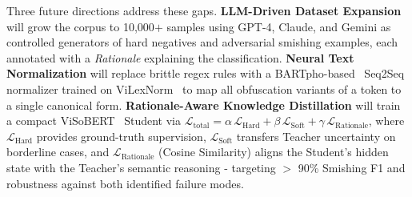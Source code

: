 \documentclass[conference]{IEEEtran}
\begin{document}
Three future directions address these gaps. \textbf{LLM-Driven Dataset
Expansion} will grow the corpus to 10,000$+$ samples using GPT-4, Claude, and
Gemini as controlled generators of hard negatives and adversarial smishing
examples, each annotated with a \textit{Rationale} explaining the
classification. \textbf{Neural Text Normalization} will replace brittle regex
rules with a BARTpho-based~\cite{nguyen2022bartpho} Seq2Seq normalizer trained
on ViLexNorm~\cite{nhi2024vilexnorm} to map all obfuscation variants of a token
to a single canonical form. \textbf{Rationale-Aware Knowledge Distillation}
will train a compact ViSoBERT~\cite{nguyen2023visobert} Student via
$\mathcal{L}_\text{total} = \alpha\,\mathcal{L}_\text{Hard}
+ \beta\,\mathcal{L}_\text{Soft} + \gamma\,\mathcal{L}_\text{Rationale}$,
where $\mathcal{L}_\text{Hard}$ provides ground-truth supervision,
$\mathcal{L}_\text{Soft}$ transfers Teacher uncertainty on borderline cases, and
$\mathcal{L}_\text{Rationale}$ (Cosine Similarity) aligns the Student's hidden
state with the Teacher's semantic reasoning - targeting $>$ 90\% Smishing F1 and
robustness against both identified failure modes.

\end{document}
